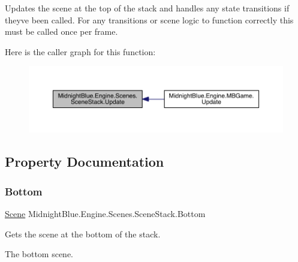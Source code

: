 Updates the scene at the top of the stack and handles any state transitions if they\textquotesingle{}ve been called. For any transitions or scene logic to function correctly this must be called once per frame. 

Here is the caller graph for this function\+:
\nopagebreak
\begin{figure}[H]
\begin{center}
\leavevmode
\includegraphics[width=350pt]{class_midnight_blue_1_1_engine_1_1_scenes_1_1_scene_stack_a440c1403c5992a98a7f9fb9feb8849cc_icgraph}
\end{center}
\end{figure}


\subsection{Property Documentation}
\hypertarget{class_midnight_blue_1_1_engine_1_1_scenes_1_1_scene_stack_acc1654af61556e98cbe9c9ba6956b851}{}\label{class_midnight_blue_1_1_engine_1_1_scenes_1_1_scene_stack_acc1654af61556e98cbe9c9ba6956b851} 
\subsubsection{\texorpdfstring{Bottom}{Bottom}}
{\footnotesize\ttfamily \hyperlink{class_midnight_blue_1_1_engine_1_1_scenes_1_1_scene}{Scene} Midnight\+Blue.\+Engine.\+Scenes.\+Scene\+Stack.\+Bottom\hspace{0.3cm}{\ttfamily [get]}}



Gets the scene at the bottom of the stack. 

The bottom scene.\hypertarget{class_midnight_blue_1_1_engine_1_1_scenes_1_1_scene_stack_af627b4608cf7f5bb22ff9610f275fb86}{}\label{class_midnight_blue_1_1_engine_1_1_scenes_1_1_scene_stack_af627b4608cf7f5bb22ff9610f275fb86} 
